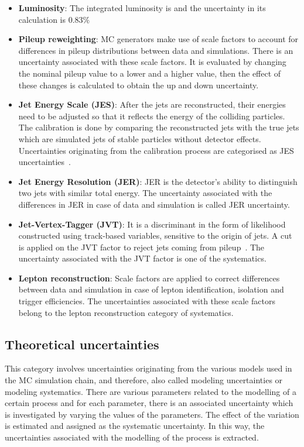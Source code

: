 \begin{itemize}
  \item \textbf{Luminosity}: The integrated luminosity is \lumi and the uncertainty in its calculation
  is $0.83\%$

  \item \textbf{Pileup reweighting}: MC generators make use of scale factors to account for differences in 
  pileup distributions between data and simulations. There is an uncertainty associated with these 
  scale factors. It is evaluated by changing the nominal pileup value to a lower and a higher value,
  then the effect of these changes is calculated to obtain the up and down uncertainty.

  \item \textbf{Jet Energy Scale (JES)}: After the jets are reconstructed, their energies need to be 
  adjusted so that it reflects the energy of the colliding particles. The calibration is done by 
  comparing the reconstructed jets with the true jets which are simulated jets of stable particles 
  without detector effects. Uncertainties originating from the calibration process are categorised 
  as JES uncertainties~\cite{Barillari2012}.

  \item \textbf{Jet Energy Resolution (JER)}: JER is the detector's ability to distinguish two jets 
  with similar total energy. The uncertainty associated with the differences in JER in case of data and 
  simulation is called JER uncertainty. 

  \item \textbf{Jet-Vertex-Tagger (JVT)}: It is a discriminant in the form of likelihood constructed 
  using track-based variables, sensitive to the origin of jets. A cut is applied on the JVT factor to
  reject jets coming from pileup~\cite{ATL-PHYS-PUB-2015-040}. The uncertainty associated with the JVT factor 
  is one of the systematics.

  \item \textbf{Lepton reconstruction}: Scale factors are applied to correct differences between data and
  simulation in case of lepton identification, isolation and trigger efficiencies. The uncertainties
  associated with these scale factors belong to the lepton reconstruction category of systematics.  

\end{itemize}

\subsection{Theoretical uncertainties}
This category involves uncertainties originating from the various models used in the MC simulation 
chain, and therefore, also called modeling uncertainties or modeling systematics. There are various 
parameters related to the modelling of a certain process and for each parameter, there is 
an associated uncertainty which is investigated by varying the values of the parameters. The effect of 
the variation is estimated and assigned as the systematic uncertainty. In this way,
the uncertainties associated with the modelling of the process is extracted. 
  
